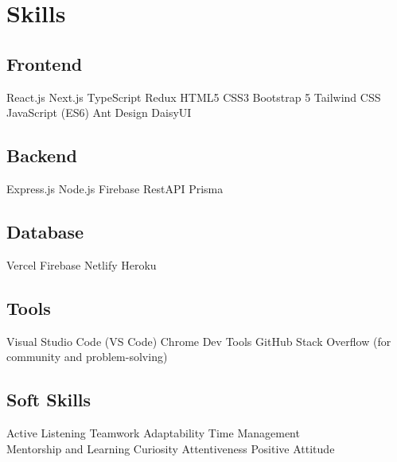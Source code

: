 \documentclass[]{plushcv}
\begin{document}
\hfill
\begin{minipage}[t]{0.25\textwidth} 


\section{Skills}
\subsection{Frontend}
\sectionsep 
 \textbullet{} React.js \textbullet{} Next.js \textbullet{} TypeScript \textbullet{} Redux  \textbullet{} HTML5 \textbullet{} CSS3 \textbullet{} Bootstrap 5 \textbullet{} Tailwind CSS   \textbullet{}
JavaScript (ES6) \textbullet{} Ant Design \textbullet{} DaisyUI \\
\sectionsep
\subsection{Backend}
\sectionsep
Express.js \textbullet{} Node.js \textbullet{} Firebase \textbullet{} RestAPI \textbullet{} Prisma \\ 
\sectionsep
\subsection{Database}
\sectionsep
Vercel \textbullet{} Firebase \textbullet{} Netlify \textbullet{} Heroku \\
\sectionsep
\subsection{Tools}
\sectionsep
Visual Studio Code (VS Code) \textbullet{} Chrome Dev Tools \textbullet{} GitHub \textbullet{} Stack Overflow (for community and problem-solving) \\
\sectionsep
\subsection{Soft Skills}
\sectionsep
Active Listening \textbullet{} Teamwork \textbullet{} Adaptability \textbullet{} Time Management \textbullet{} \\
Mentorship and Learning \textbullet{} Curiosity \textbullet{} Attentiveness \textbullet{} Positive Attitude \\




\end{minipage}
\end{document}
